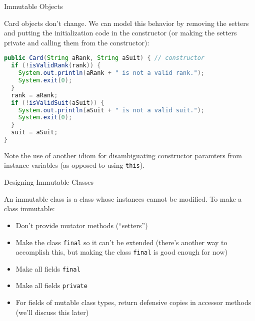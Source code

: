 \documentclass{beamer}
\begin{document}
\begin{frame}[fragile]{Immutable Objects}

\vspace{-.05in}
Card objects don't change.  We can model this behavior by removing the setters and putting the initialization code in the constructor (or making the setters private and calling them from the constructor):

\begin{lstlisting}[language=Java]
public Card(String aRank, String aSuit) { // constructor
  if (!isValidRank(rank)) {
    System.out.println(aRank + " is not a valid rank.");
    System.exit(0);
  }
  rank = aRank;
  if (!isValidSuit(aSuit)) {
    System.out.println(aSuit + " is not a valid suit.");
    System.exit(0);
  }
  suit = aSuit;
}
\end{lstlisting}
\vspace{-.05in}
\small Note the use of another idiom for disambiguating constructor paramters from instance variables (as opposed to using {\tt this}).\normalsize

\end{frame}

\begin{frame}[fragile]{Designing Immutable Classes}


An immutable class is a class whose instances cannot be modified.  To make a class immutable:

\begin{itemize}
\item Don't provide mutator methods (``setters'')
\item Make the class {\tt final} so it can't be extended (there's another way to accomplish this, but making the class {\tt final} is good enough for now)
\item Make all fields {\tt final}
\item Make all fields {\tt private}
\item For fields of mutable class types, return defensive copies in accessor methods (we'll discuss this later)
\end{itemize}

\end{frame}
\end{document}
